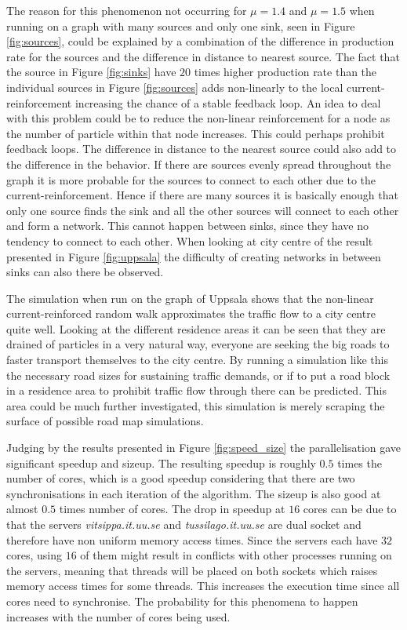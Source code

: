 The reason for this phenomenon not occurring for $\mu = 1.4$ and $\mu = 1.5$ when running on a graph with many sources and only one sink, seen in Figure \ref{fig:sources}, could be explained by a combination of the difference in production rate for the sources and the difference in distance to nearest source. The fact that the source in Figure \ref{fig:sinks} have $20$ times higher production rate than the individual sources in Figure \ref{fig:sources} adds non-linearly to the local current-reinforcement increasing the chance of a stable feedback loop. An idea to deal with this problem could be to reduce the non-linear reinforcement for a node as the number of particle within that node increases. This could perhaps prohibit feedback loops. The difference in distance to the nearest source could also add to the difference in the behavior. If there are sources evenly spread throughout the graph it is more probable for the sources to connect to each other due to the current-reinforcement. Hence if there are many sources it is basically enough that only one source finds the sink and all the other sources will connect to each other and form a network. This cannot happen between sinks, since they have no tendency to connect to each other. When looking at city centre of the result presented in Figure \ref{fig:uppsala} the difficulty of creating networks in between sinks can also there be observed.

The simulation when run on the graph of Uppsala shows that the non-linear current-reinforced random walk approximates the traffic flow to a city centre quite well. Looking at the different residence areas it can be seen that they are drained of particles in a very natural way, everyone are seeking the big roads to faster transport themselves to the city centre. By running a simulation like this the necessary road sizes for sustaining traffic demands, or if to put a road block in a residence area to prohibit traffic flow through there can be predicted. This area could be much further investigated, this simulation is merely scraping the surface of possible road map simulations.

Judging by the results presented in Figure \ref{fig:speed_size} the parallelisation gave significant speedup and sizeup. The resulting speedup is roughly $0.5$ times the number of cores, which is a good speedup considering that there are two synchronisations in each iteration of the algorithm. The sizeup is also good at almost $0.5$ times number of cores. The drop in speedup at $16$ cores can be due to that the servers \textit{vitsippa.it.uu.se} and \textit{tussilago.it.uu.se} are dual socket and therefore have non uniform memory access times. Since the servers each have $32$ cores, using $16$ of them might result in conflicts with other processes running on the servers, meaning that threads will be placed on both sockets which raises memory access times for some threads. This increases the execution time since all cores need to synchronise. The probability for this phenomena to happen increases with the number of cores being used.

